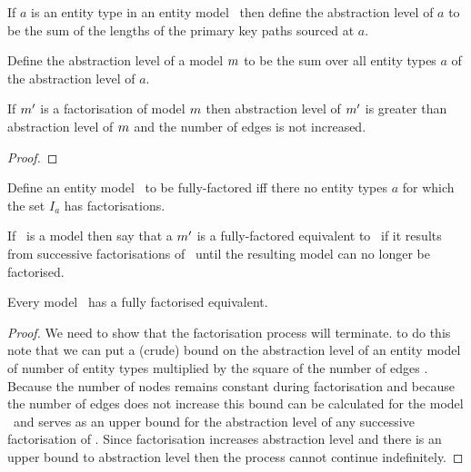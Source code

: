 \begin{definition}
If $a$ is an entity type in an entity model \genericmodel\ then define the abstraction
level of $a$ to be the sum of the lengths of the primary key paths sourced at $a$.
\end{definition}


\begin{definition}
Define  the abstraction level of a model ${m}$ to be
the sum over all entity types $a$ of the abstraction level of $a$.
\end{definition}

\begin{lemma}
If ${m}'$ is a factorisation of model ${m}$ then abstraction level 
of ${m}'$ is greater than abstraction level of ${m}$ and the number of edges
is not increased. 
\end{lemma}
\begin{proof}
\end{proof}

\begin{definition}
Define an entity model \genericmodel\ to be fully-factored iff there no entity types $a$
for which the set $I_a$ has  factorisations.
\end{definition}

\begin{definition}
If \genericmodel\ is a model then say that a ${m}'$ is a fully-factored 
equivalent to \genericmodel\
if it results from successive factorisations of \genericmodel\ until the resulting model can no longer be
factorised. 
\end{definition}

\begin{lemma}
Every model \genericmodel\ has a fully factorised equivalent. 
\end{lemma}
\begin{proof}
We need to show that the factorisation process will terminate. 
to do this note that we can put a (crude) bound on the abstraction level of an entity model
of number of entity types multiplied by the square of the  number of edges
\commentary{Need revise this most likely}.  Because the number of nodes remains constant during
factorisation and because the number of edges does not increase this bound can be calculated
for the model \genericmodel\ and serves as an upper bound for the abstraction level of 
any successive factorisation of \genericmodel. Since factorisation increases abstraction level
and there is an upper bound to abstraction level then the process cannot continue indefinitely. 
\end{proof}


